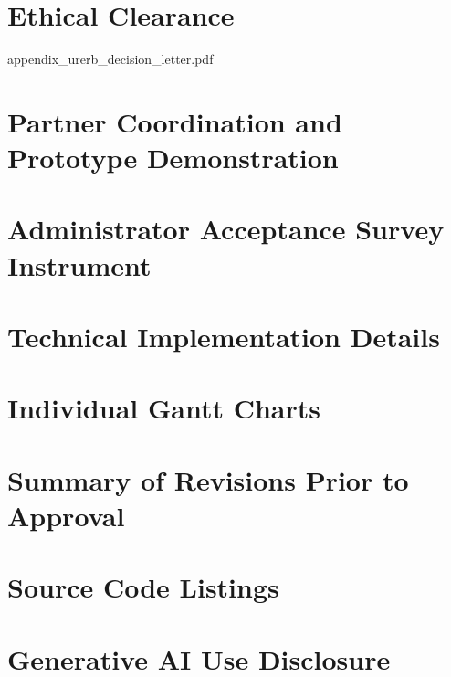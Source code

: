 	\chapter{Ethical Clearance}
	\label{ch:appendix_urerb_decision_letter}
	
	{appendix_urerb_decision_letter.pdf}
	\cleardoublepage

	\chapter{Partner Coordination and Prototype Demonstration}
	\label{ch:appendix_partner_evidence}
	
	\cleardoublepage

	\chapter{Administrator Acceptance Survey Instrument}
	\label{ch:appendix_survey_instrument}
	
	\cleardoublepage

	\chapter{Technical Implementation Details}
	\label{ch:appendix_technical_details}
	
	\cleardoublepage

	\chapter{Individual Gantt Charts}
	\label{ch:appendix_gantt}
	
	\cleardoublepage

	\chapter{Summary of Revisions Prior to Approval}
	\label{ch:rev_final}
	
	\cleardoublepage

	\chapter{Source Code Listings}
	\label{ch:appendix_source_code}
	
	\cleardoublepage

	\chapter{Generative AI Use Disclosure}
	\label{ch:appendix_ai_disclosure}
	
	\cleardoublepage


